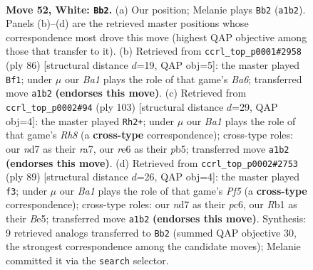 \documentclass[11pt]{article}
\begin{document}
\clearpage

\begin{figure}[p]\centering
\begin{subfigure}{0.46\textwidth}\centering
\resizebox{\linewidth}{!}{%
\newchessgame
\chessboard[
  setfen={6k1/3n4/4r3/8/p1p2KP1/P1P4p/2P4P/BR6 w - - 9 52},
  showmover=false,
  pgfstyle=straightmove, color=movearrow, markmove={a1-b2}
]}
\caption{}
\end{subfigure}\hfill
\begin{subfigure}{0.46\textwidth}\centering
\resizebox{\linewidth}{!}{%
\newchessgame
\chessboard[
  setfen={8/6k1/B3R3/5p2/5P2/1p4Pp/1Pn2K1P/3r4 w - - 2 44},
  showmover=false,
  pgfstyle=straightmove, color=movearrow, markmove={a6-f1}
]}
\caption{}
\end{subfigure}
\\[4pt]
\begin{subfigure}{0.46\textwidth}\centering
\resizebox{\linewidth}{!}{%
\newchessgame
\chessboard[
  setfen={8/R7/3kpp1p/PP1b4/5P2/8/1N1K4/7r b - - 4 52},
  showmover=false,
  pgfstyle=straightmove, color=movearrow, markmove={h1-h2}
]}
\caption{}
\end{subfigure}\hfill
\begin{subfigure}{0.46\textwidth}\centering
\resizebox{\linewidth}{!}{%
\newchessgame
\chessboard[
  setfen={8/8/2P1k1p1/4b1Pp/p1K2p2/P6P/8/6B1 b - - 0 45},
  showmover=false,
  pgfstyle=straightmove, color=movearrow, markmove={f4-f3}
]}
\caption{}
\end{subfigure}
\caption{\textbf{Move 52, White: \texttt{Bb2}.} (a) Our position; Melanie plays \texttt{Bb2} (\texttt{a1b2}). Panels (b)--(d) are the retrieved master positions whose correspondence most drove this move (highest QAP objective among those that transfer to it). (b) Retrieved from \texttt{ccrl\_top\_p0001\#2958} (ply 86) [structural distance $d$=19, QAP obj=5]: the master played \texttt{Bf1}; under $\mu$ our \emph{Ba1} plays the role of that game's \emph{Ba6}; transferred move \texttt{a1b2} \textbf{(endorses this move)}. (c) Retrieved from \texttt{ccrl\_top\_p0002\#94} (ply 103) [structural distance $d$=29, QAP obj=4]: the master played \texttt{Rh2+}; under $\mu$ our \emph{Ba1} plays the role of that game's \emph{Rh8} (a \textbf{cross-type} correspondence); cross-type roles: our \emph{n}d7 as their \emph{r}a7, our \emph{r}e6 as their \emph{p}b5; transferred move \texttt{a1b2} \textbf{(endorses this move)}. (d) Retrieved from \texttt{ccrl\_top\_p0002\#2753} (ply 89) [structural distance $d$=26, QAP obj=4]: the master played \texttt{f3}; under $\mu$ our \emph{Ba1} plays the role of that game's \emph{Pf5} (a \textbf{cross-type} correspondence); cross-type roles: our \emph{n}d7 as their \emph{p}c6, our \emph{R}b1 as their \emph{B}e5; transferred move \texttt{a1b2} \textbf{(endorses this move)}. Synthesis: 9 retrieved analogs transferred to \texttt{Bb2} (summed QAP objective 30, the strongest correspondence among the candidate moves); Melanie committed it via the \texttt{search} selector.}
\label{fig:thought-m102}
\end{figure}
\end{document}
